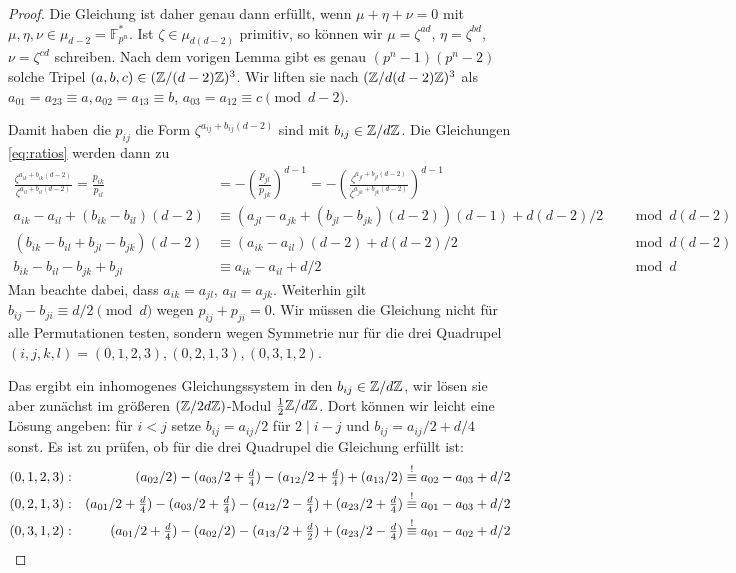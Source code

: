 \begin{proof}
Die Gleichung ist daher genau dann erfüllt, wenn $\mu+\eta+\nu = 0$ mit $\mu, \eta, \nu \in \mu_{d-2} = \mathbb F_{p^n}^*$. Ist $\zeta \in \mu_{d(d-2)}$ primitiv, so können wir $\mu = \zeta^{ad}$, $\eta = \zeta^{bd}$, $\nu = \zeta^{cd}$ schreiben. Nach dem vorigen Lemma gibt es genau $(p^n-1)(p^n-2)$ solche Tripel $(a,b,c) \in (\Zmod (d-2)Z)^3$. Wir liften sie nach $(\Zmod d(d-2)Z)^3$ als $a_{01} = a_{23} \equiv a, a_{02} = a_{13} \equiv b$, $a_{03} = a_{12} \equiv c \pmod{d-2}$.

Damit haben die $p_{ij}$ die Form $\zeta^{a_{ij} + b_{ij}(d-2)}$ sind mit $b_{ij} \in \Zmod dZ$. Die Gleichungen \eqref{eq:ratios} werden dann zu
\begin{align*}
\frac{\zeta^{a_{ik} + b_{ik}(d-2)}}{\zeta^{a_{il} + b_{il}(d-2)}} = \frac{p_{ik}}{p_{il}} &= -\left(\frac{p_{jl}}{p_{jk}}\right)^{d-1} = -\left(\frac{\zeta^{a_{jl} + b_{jl}(d-2)}}{\zeta^{a_{jk} + b_{jk}(d-2)}}\right)^{d-1} \\
a_{ik} - a_{il} + (b_{ik} - b_{il})(d-2) &\equiv (a_{jl} - a_{jk} + (b_{jl} - b_{jk})(d-2))(d-1) + d(d-2)/2 &&\mod{d(d-2)} \\
(b_{ik} - b_{il} + b_{jl} - b_{jk})(d-2) &\equiv (a_{ik} - a_{il})(d-2) + d(d-2)/2 &&\mod{d(d-2)} \\
b_{ik} - b_{il} - b_{jk} + b_{jl} &\equiv a_{ik} - a_{il} + d/2 &&\mod d
\end{align*}
Man beachte dabei, dass $a_{ik} = a_{jl}$, $a_{il} = a_{jk}$. Weiterhin gilt $b_{ij} - b_{ji} \equiv d/2 \pmod d$ wegen $p_{ij} + p_{ji} = 0$. Wir müssen die Gleichung nicht für alle Permutationen testen, sondern wegen Symmetrie nur für die drei Quadrupel $(i,j,k,l) = (0,1,2,3), (0,2,1,3), (0,3,1,2)$.

Das ergibt ein inhomogenes Gleichungssystem in den $b_{ij} \in \Zmod dZ$, wir lösen sie aber zunächst im größeren $(\Zmod 2dZ)$-Modul $\frac 12 \Zmod dZ$. Dort können wir leicht eine Lösung angeben: für $i<j$ setze $b_{ij} = a_{ij}/2$ für $2 \mid i-j$ und $b_{ij} = a_{ij}/2 + d/4$ sonst. Es ist zu prüfen, ob für die drei Quadrupel die Gleichung erfüllt ist:
\begin{align*}
&(0,1,2,3): &(a_{02}/2) - (a_{03}/2+\tfrac d4) - (a_{12}/2+\tfrac d4) + (a_{13}/2) &\overrel{\equiv}^! a_{02} - a_{03} + d/2 \\
&(0,2,1,3): &(a_{01}/2+\tfrac d4) - (a_{03}/2+\tfrac d4) - (a_{12}/2-\tfrac d4) + (a_{23}/2+\tfrac d4) &\overrel{\equiv}^! a_{01} - a_{03} + d/2 \\
&(0,3,1,2): &(a_{01}/2+\tfrac d4) - (a_{02}/2) - (a_{13}/2+\tfrac d2) + (a_{23}/2-\tfrac d4) &\overrel{\equiv}^! a_{01} - a_{02} + d/2
\end{align*}


\end{proof}
